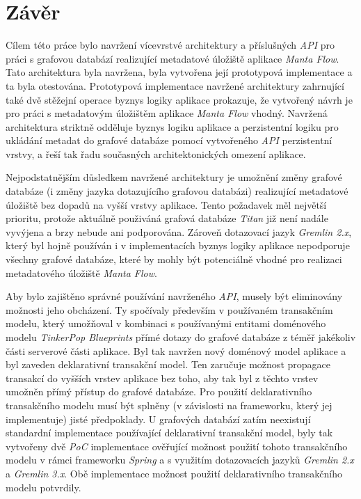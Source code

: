 \chapter{Závěr}
Cílem této práce bylo navržení vícevrstvé architektury a příslušných \textit{API} pro práci s grafovou databází realizující metadatové úložiště aplikace \textit{Manta Flow}. Tato architektura byla navržena, byla vytvořena její prototypová implementace a ta byla otestována. Prototypová implementace navržené architektury zahrnující také dvě stěžejní operace byznys logiky aplikace prokazuje, že vytvořený návrh je pro práci s metadatovým úložištěm aplikace \textit{Manta Flow} vhodný. Navržená architektura striktně odděluje byznys logiku aplikace a perzistentní logiku pro ukládání metadat do grafové databáze pomocí vytvořeného \textit{API} perzistentní vrstvy, a řeší tak řadu současných architektonických omezení aplikace.

Nejpodstatnějším důsledkem navržené architektury je umožnění změny grafové databáze (i změny jazyka dotazujícího grafovou databázi) realizující metadatové úložiště bez dopadů na vyšší vrstvy aplikace. Tento požadavek měl největší prioritu, protože aktuálně použiváná grafová databáze \textit{Titan} již není nadále vyvýjena a brzy nebude ani podporována. Zároveň dotazovací jazyk \textit{Gremlin 2.x}, který byl hojně používán i v implementacích byznys logiky aplikace nepodporuje všechny grafové databáze, které by mohly být potenciálně vhodné pro realizaci metadatového úložiště \textit{Manta Flow}.

Aby bylo zajištěno správné používání navrženého \textit{API}, musely být eliminovány možnosti jeho obcházení. Ty spočívaly především v používaném transakčním modelu, který umožňoval v kombinaci s používanými entitami doménového modelu \textit{TinkerPop Blueprints} přímé dotazy do grafové databáze z téměř jakékoliv části serverové části aplikace. Byl tak navržen nový doménový model aplikace a byl zaveden deklarativní transakční model. Ten zaručuje možnost propagace transakcí do vyšších vrstev aplikace bez toho, aby tak byl z těchto vrstev umožněn přímý přístup do grafové databáze. Pro použití deklarativního transakčního modelu musí být splněny (v závislosti na frameworku, který jej implementuje) jisté předpoklady. U grafových databází zatím neexistují standardní implementace používající deklarativní transakční model, byly tak vytvořeny dvě \textit{PoC} implementace ověřující možnost použití tohoto transakčního modelu v rámci frameworku \textit{Spring} a s využitím dotazovacích jazyků \textit{Gremlin 2.x} a \textit{Gremlin 3.x}. Obě implementace možnost použití deklarativního transakčního modelu potvrdily.

